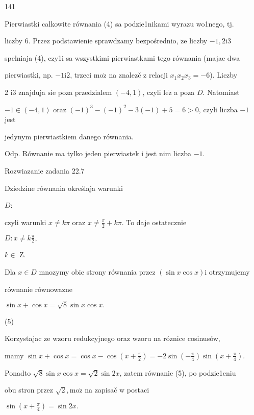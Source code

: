 \documentclass[a4paper,12pt]{article}
\begin{document}
141

Pierwiastki calkowite równania (4) sa podzie1nikami wyrazu wo1nego, $\mathrm{t}\mathrm{j}.$

liczby 6. Przez podstawienie sprawdzamy bezpośrednio, $\dot{\mathrm{z}}\mathrm{e}$ liczby $-1, 2\mathrm{i}3$

spelniaja (4), czy1i sa wszystkimi pierwiastkami tego równania (majac dwa

pierwiastki, np. $-1\mathrm{i}2$, trzeci $\mathrm{m}\mathrm{o}\dot{\mathrm{z}}$ na znalez$\acute{}$č $\mathrm{z}$ relacji $x_{1}x_{2}x_{3}=-6$). Liczby

2 $\mathrm{i}3$ znajduja $\mathrm{s}\mathrm{i}\mathrm{e}$ poza przedzialem $(-4,1)$, czyli $\mathrm{l}\mathrm{e}\dot{\mathrm{z}}$ a poza $D$. Natomiast

$-1\in(-4,1)$ oraz $(-1)^{3}-(-1)^{2}-3(-1)+5=6>0$, czyli liczba $-1$ jest

jedynym pierwiastkiem danego równania.

Odp. Równanie ma tylko jeden pierwiastek $\mathrm{i}$ jest nim liczba $-1.$

Rozwiazanie zadania 22.7

Dziedzine równania określaja warunki

$D$: 

czyli warunki $ x\neq k\pi$ oraz $ x\displaystyle \neq\frac{\pi}{2}+k\pi$. To daje ostatecznie

$D:x\displaystyle \neq k\frac{\pi}{2},$

$ k\in$ Z.

Dla $x\in D$ mnozymy obie strony równania przez $(\sin x\cos x)\mathrm{i}$ otrzymujemy

równanie równowazne

$\sin x+\cos x=\sqrt{8}\sin x\cos x.$

(5)

Korzystajac ze wzoru redukcyjnego oraz wzoru na róznice cosinusów,

mamy $\sin x+\cos x = \displaystyle \cos x-\cos(x+\frac{\pi}{2}) = -2\displaystyle \sin(-\frac{\pi}{4})\sin(x+\frac{\pi}{4}).$

Ponadto $\sqrt{8}\sin x\cos x = \sqrt{2}\sin 2x$, zatem równanie (5), po podzie1eniu

obu stron przez $\sqrt{2}, \mathrm{m}\mathrm{o}\dot{\mathrm{z}}$ na zapisač $\mathrm{w}$ postaci

$\displaystyle \sin(x+\frac{\pi}{4})=\sin 2x.$
\end{document}
